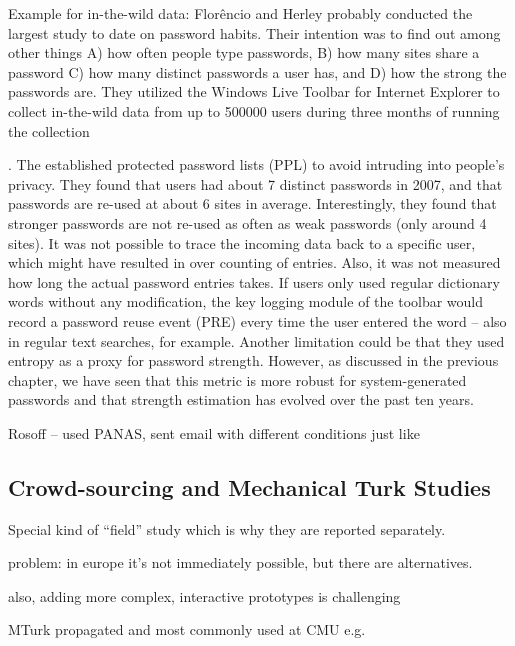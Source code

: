 Example for in-the-wild data: 
Flor\^{e}ncio and Herley probably conducted the largest study to date on password habits. Their intention was to find out among other things A) how often people type passwords, B) how many sites share a password C) how many distinct passwords a user has, and D) how the strong the passwords are. They utilized the Windows Live Toolbar for Internet Explorer to collect in-the-wild data from up to 500000 users during three months of running the collection

\cite{Florencio2007LargeScaleStudyPasswordHabits}. The established protected password lists (PPL) to avoid intruding into people's privacy. They found that users had about 7 distinct passwords in 2007, and that passwords are re-used at about 6 sites in average. Interestingly, they found that stronger passwords are not re-used as often as weak passwords (only around 4 sites). It was not possible to trace the incoming data back to a specific user, which might have resulted in over counting of entries. Also, it was not measured how long the actual password entries takes. If users only used regular dictionary words without any modification, the key logging module of the toolbar would record a password reuse event (PRE) every time the user entered the word -- also in regular text searches, for example. Another limitation could be that they used entropy as a proxy for password strength. However, as discussed in the previous chapter, we have seen that this metric is more robust for system-generated passwords and that strength estimation has evolved over the past ten years. 

Rosoff \etal \cite{Rosoff2014BehavioralExperimentsFraud} -- used PANAS, sent email with different conditions just like \cite{Huh2017TooBusy}


\subsection{Crowd-sourcing and Mechanical Turk Studies}
Special kind of ``field'' study which is why they are reported separately.

problem: in europe it's not immediately possible, but there are alternatives. 

also, adding more complex, interactive prototypes is challenging

\cite{Peer2017BeyondTheTurk}
\cite{Ross2010WhoAreTurkers}
\cite{Savage2012GainingWisdomCrowds}

MTurk
propagated and most commonly used at CMU e.g. \cite{Mazurek2013Measuring} \cite{Shay2014CanLongPasswordsBeSecureAndUsable} \cite{Shay2016DesigningPasswordPolicies}
\cite{Shay2015UsablePoliciesMTurk}
\cite{Ur2016PerceptionsPassword} \cite{Melicher2016UsabilityMobileTextPasswords} \cite{Ur2017DataDrivenPWMeter}

